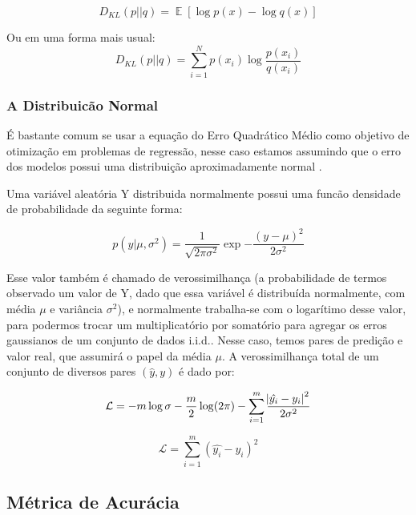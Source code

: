 \[D_{KL}(p || q) = \mathop{\mathbb{E}}[\log p(x) - \log q(x)]​\]

Ou em uma forma mais usual: \\

\[D_{KL}(p||q) = \sum_{i=1}^{N}p(x_{i}) \log \frac{p(x_{i})}{q(x_{i})}​\]


\subsubsection{A Distribuicão Normal}
\label{sec:reglog}


É bastante comum se usar a equação do Erro Quadrático Médio como objetivo de
otimização em problemas de regressão, nesse caso estamos assumindo que o erro
dos modelos possui uma distribuição aproximadamente normal \cite{dlbook}. 

Uma variável aleatória Y distribuida normalmente possui uma funcão densidade de
probabilidade da seguinte forma:

\begin{equation}
  \label{eq:ver}
p(y| \mu,\sigma^2) = \frac{1}{\sqrt{2\pi\sigma^2}}\exp{-\frac{(y - \mu)^2}{2\sigma^2}}
\end{equation}

Esse valor também é chamado de verossimilhança (a probabilidade de termos
observado um valor de Y, dado que essa variável é distribuída normalmente, com média $\mu$ e variância $\sigma^2$), e
normalmente trabalha-se com o logarítimo desse valor, para podermos trocar um
multiplicatório por somatório para agregar os erros gaussianos de um conjunto de dados
i.i.d.. Nesse caso, temos pares de predição e valor real, que assumirá o papel
da média $\mu$. A verossimilhança total de um conjunto de diversos pares
$(\hat{y},y)$ é dado por: 

\begin{equation}
\label{eq:logver1}
  \mathcal{L}= -m \log \sigma - \frac{m}{2} \log (2 \pi) - \sum^m_{i=1}
  \frac{\abs{\hat{y_i}-y_i}^2}{2 \sigma^2}
\end{equation}


\begin{equation}
  \label{eq:logver2}
  \mathcal{L}=  \sum^m_{i=1} (\hat{y_i}-y_i)^2
\end{equation}



\subsection{Métrica de Acurácia}

